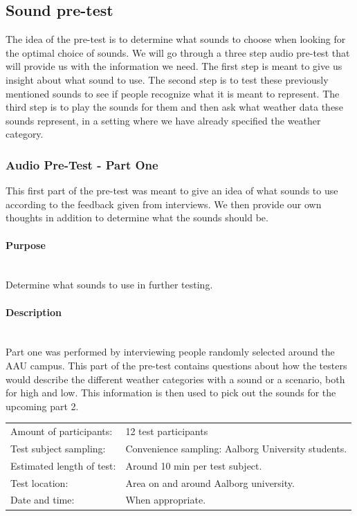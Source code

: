 
\FloatBarrier
\subsection{Sound pre-test} %
\label{sub:sound_pre_test}
The idea of the pre-test is to determine what sounds to choose when looking for the optimal choice of sounds. 
We will go through a three step audio pre-test that will provide us with the information we need. 
The first step is meant to give us insight about what sound to use. 
The second step is to test these previously mentioned sounds to see if people recognize what it is meant to represent. 
The third step is to play the sounds for them and then ask what weather data these sounds represent, in a setting where we have already specified the weather category.

\subsubsection{Audio Pre-Test - Part One} %
\label{ssub:audio_pre_test_part_one}
This first part of the pre-test was meant to give an idea of what sounds to use according to the feedback given from interviews. 
We then provide our own thoughts in addition to determine what the sounds should be.

\paragraph{Purpose} %
\label{par:purpose} 
\hspace{0pt} \\
Determine what sounds to use in further testing.


\paragraph{Description} %
\label{par:description}
\hspace{0pt} \\
Part one was performed by interviewing people randomly selected around the AAU campus. 
This part of the pre-test contains questions about how the testers would describe the different weather categories with a sound or a scenario, both for high and low. 
This information is then used to pick out the sounds for the upcoming part 2.

\begin{tabular}{l l}
Amount of participants: & 12 test participants \\
Test subject sampling: & Convenience sampling: Aalborg University students. \\
Estimated length of test: & Around 10 min per test subject. \\
Test location: & Area on and around Aalborg university. \\
Date and time: & When appropriate.
\end{tabular}

